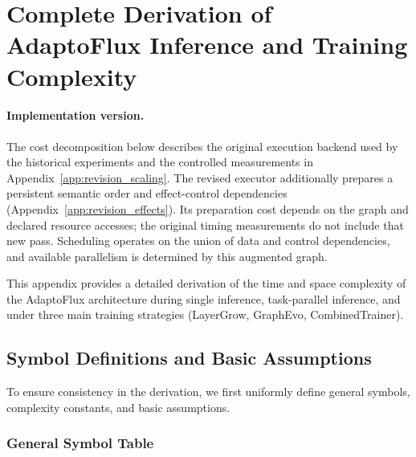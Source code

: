\section{Complete Derivation of AdaptoFlux Inference and Training Complexity}
\label{sec:complexity_analysis}

\paragraph{Implementation version.}
The cost decomposition below describes the original execution backend used by the historical experiments and the controlled measurements in Appendix~\ref{app:revision_scaling}. The revised executor additionally prepares a persistent semantic order and effect-control dependencies (Appendix~\ref{app:revision_effects}). Its preparation cost depends on the graph and declared resource accesses; the original timing measurements do not include that new pass. Scheduling operates on the union of data and control dependencies, and available parallelism is determined by this augmented graph.


This appendix provides a detailed derivation of the time and space complexity of the AdaptoFlux architecture during single inference, task-parallel inference, and under three main training strategies (LayerGrow, GraphEvo, CombinedTrainer).

\subsection{Symbol Definitions and Basic Assumptions}

To ensure consistency in the derivation, we first uniformly define general symbols, complexity constants, and basic assumptions.

\subsubsection{General Symbol Table}

